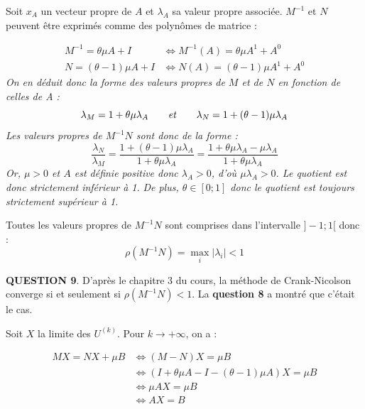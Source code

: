\documentclass[a4paper,11pt]{article}
\newcommand{\quest}[1]{\small\textbf{#1}\normalsize}
\theoremstyle{nonumberplain}
\theoremstyle{nonumberplain}
\theoremstyle{nonumberplain}
\begin{document}
    \smallskip
    Soit $x_A$ un vecteur propre de $A$ et $\lambda_A$ sa valeur propre associée.\newline
    $M^{-1}$ et $N$ peuvent être exprimés comme des polynômes de matrice :
    \begin{calculs}
        \vspace{-2ex}
        \begin{equation*}
        \begin{split}
            M^{-1}  = \theta\mu A + I & \iff M^{-1}(A) = \theta\mu A^1 + A^0 \\
            N       = (\theta - 1)\mu A + I & \iff N(A) = (\theta - 1)\mu A^1 + A^0
        \end{split}
        \end{equation*}
        \emph{On en déduit donc la forme des valeurs propres de $M$ et de $N$
        en fonction de celles de A :}
        $$ \lambda_M = 1+\theta \mu \lambda_A\qquad\text{\emph{et}}\qquad\lambda_N = 1+(\theta - 1)\mu \lambda_A$$
        \emph{Les valeurs propres de $M^{-1}N$ sont donc de la forme :}
        $$ \frac{\lambda_N}{\lambda_M} = \frac{1+(\theta - 1)\mu \lambda_A}{1+\theta \mu \lambda_A}
                                       = \frac{1+\theta\mu \lambda_A - \mu \lambda_A}{1+\theta \mu \lambda_A}$$
        \emph{Or, $\mu > 0$ et $A$ est définie positive donc $\lambda_A > 0$, d'où $\mu\lambda_A > 0$.\newline
        Le quotient est donc strictement inférieur à 1.}\newline\newline
        \emph{De plus, $\theta \in [0; 1]$ donc le quotient est toujours strictement supérieur à 1.}
    \end{calculs}

    Toutes les valeurs propres de $M^{-1}N$ sont comprises dans
    l'intervalle $]-1; 1[$ donc :
    $$\rho(M^{-1}N) = \max_i |\lambda_i| < 1$$

    \bigskip
    \quest{QUESTION 9}. D'après le chapitre 3 du cours, la méthode de Crank-Nicolson
    converge si et seulement si $\rho(M^{-1}N) < 1$. La \textbf{question 8}
    a montré que c'était le cas.\newline

    \medskip
    Soit $X$ la limite des $U^{(k)}$. Pour $k \rightarrow +\infty$, on a :
    \begin{calculs}
        \vspace{-2ex}
        \begin{equation*}
        \begin{split}
            MX = NX + \mu B & \iff (M - N) X = \mu B \\
                            & \iff (I + \theta \mu A - I - (\theta - 1) \mu A) X = \mu B \\
                            & \iff \mu A X = \mu B \\
                            & \iff A X = B
        \end{split}
        \end{equation*}
    \end{calculs}
\end{document}
